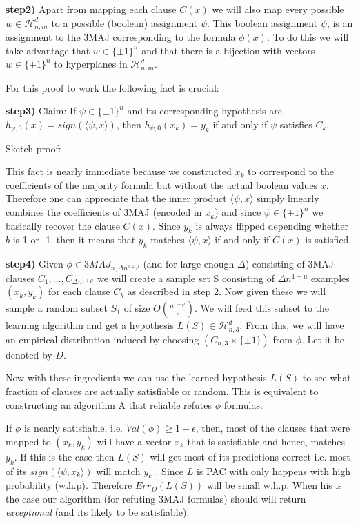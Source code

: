 \documentclass[11pt,a4paper]{article}
\begin{document}
\textbf{step2)} Apart from mapping each clause $C(x)$ we will also map every possible $w \in\mathcal{H}^d_{n,m}$ to a possible (boolean) assignment $\psi $. This boolean assignment $\psi$, is an assignment to the 3MAJ corresponding to the formula $\phi(x)$. To do this we will take advantage that $w \in \{ \pm 1 \}^n $ and that there is a bijection with vectors $w \in \{ \pm 1 \}^n $ to hyperplanes in $\mathcal{H}^d_{n,m}$.

For this proof to work the following fact is crucial:

\textbf{step3) } Claim: If $\psi \in \{ \pm 1 \}^n $ and its corresponding hypothesis are $h_{\psi, 0} (x) = sign ( \langle \psi , x \rangle )$, then $h_{\psi, 0} (x_k) = y_k$ if and only if $\psi$ satisfies $C_k$.

Sketch proof:

This fact is nearly immediate because we constructed $x_k$ to correspond to the coefficients of the majority formula but without the actual boolean values $x$. Therefore one can appreciate that the inner product  $ \langle \psi , x \rangle $ simply linearly combines the coefficients of 3MAJ (encoded in $x_k$) and since $\psi \in \{ \pm 1\}^n$ we basically recover the clause $C(x)$. Since $y_k$ is always flipped depending whether $b$ is 1 or -1, then it means that $y_k$ matches $\langle \psi , x \rangle $ if and only if $C(x)$ is satisfied.

\textbf{step4) } Given $\phi \in 3MAJ_{n, \Delta n^{1 + \mu}}$ (and for large enough $\Delta$) consisting of 3MAJ clauses $C_1, ..., C_{\Delta n^{1 + \mu}}$ we will create a sample set S consisting of $\Delta n^{1 + \mu}$ examples $(x_k, y_k)$ for each clause $C_k$ as described in step 2. Now given these we will sample a random subset $S_1$ of size $O(\frac{n^{1+\mu}}{\epsilon} )$. We will feed this subset to the learning algorithm and get a hypothesis $L(S) \in \mathcal{H}^d_{n,3}$. From this, we will have an empirical distribution induced by choosing $(C_{n,3} \times \{ \pm 1\})$ from $\phi$. Let it be denoted by $D$.

Now with these ingredients we can use the learned hypothesis $L(S)$ to see what fraction of clauses are actually satisfiable or random. This is equivalent to constructing an algorithm A that reliable refutes $\phi$ formulas.

If $\phi$ is nearly satisfiable, i.e. $Val(\phi) \geq 1 - \epsilon$, then, most of the clauses that were mapped to $(x_k, y_k)$ will have a vector $x_k$ that is satisfiable and hence, matches $y_k$. If this is the case then $L(S)$ will get most of its predictions correct i.e. most of its $sign(\langle \psi , x_k \rangle)$  will match $y_k$ . Since $L$ is PAC with only happens with high probability (w.h.p). Therefore $ Err_{D}(L(S)) $ will be small w.h.p. When his is the case our algorithm (for refuting 3MAJ formulas) should will return \textit{exceptional} (and its likely to be satisfiable).
\end{document}
